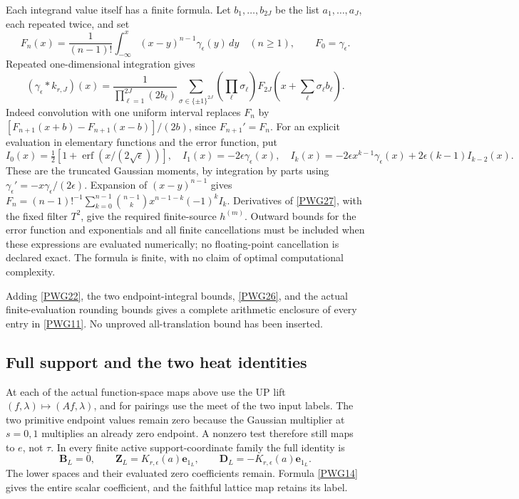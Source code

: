 Each integrand value itself has a finite formula. Let $b_1,\ldots,b_{2J}$ be the list $a_1,\ldots,a_J$, each repeated twice, and set
\[
 F_n(x)=\frac1{(n-1)!}\int_{-\infty}^x(x-y)^{n-1}\gamma_\epsilon(y)\,dy
 \quad(n\ge1),\qquad F_0=\gamma_\epsilon.
\]
Repeated one-dimensional integration gives
\begin{equation}
 (\gamma_\epsilon*k_{r,J})(x)=
 \frac1{\prod_{\ell=1}^{2J}(2b_\ell)}
 \sum_{\sigma\in\{\pm1\}^{2J}}\left(\prod_\ell\sigma_\ell\right)
 F_{2J}\left(x+\sum_\ell\sigma_\ell b_\ell\right).
                                                               \tag{PWG27}\label{PWG27}
\end{equation}
Indeed convolution with one uniform interval replaces $F_n$ by
$[F_{n+1}(x+b)-F_{n+1}(x-b)]/(2b)$, since $F_{n+1}'=F_n$.
For an explicit evaluation in elementary functions and the error function, put
\[
 I_0(x)=\tfrac12[1+\operatorname{erf}(x/(2\sqrt\epsilon))],\quad
 I_1(x)=-2\epsilon\gamma_\epsilon(x),\quad
 I_k(x)=-2\epsilon x^{k-1}\gamma_\epsilon(x)
                   +2\epsilon(k-1)I_{k-2}(x).
\]
These are the truncated Gaussian moments, by integration by parts using
$\gamma_\epsilon'=-x\gamma_\epsilon/(2\epsilon)$.
Expansion of $(x-y)^{n-1}$ gives
$F_n=(n-1)!^{-1}\sum_{k=0}^{n-1}\binom{n-1}{k}x^{n-1-k}(-1)^kI_k$.
Derivatives of \eqref{PWG27}, with the fixed filter $T^2$, give the required finite-source $h^{(m)}$. Outward bounds for the error function and exponentials and all finite cancellations must be included when these expressions are evaluated numerically; no floating-point cancellation is declared exact. The formula is finite, with no claim of optimal computational complexity.

Adding \eqref{PWG22}, the two endpoint-integral bounds, \eqref{PWG26}, and the actual finite-evaluation rounding bounds gives a complete arithmetic enclosure of every entry in \eqref{PWG11}. No unproved all-translation bound has been inserted.

\subsection{Full support and the two heat identities}
At each of the actual function-space maps above use the UP lift
$(f,\lambda)\mapsto(Af,\lambda)$, and for pairings use the meet of the two input labels. The two primitive endpoint values remain zero because the Gaussian multiplier at $s=0,1$ multiplies an already zero endpoint. A nonzero test therefore still maps to $e$, not $\tau$. In every finite active support-coordinate family the full identity is
\begin{equation}
 \boldsymbol B_L=0,\qquad
 \boldsymbol Z_L=K_{r,\epsilon}(a)\mathbf e_{1_L},\qquad
 \boldsymbol D_L=-K_{r,\epsilon}(a)\mathbf e_{1_L}.
                                                               \tag{PWG23}\label{PWG23}
\end{equation}
The lower spaces and their evaluated zero coefficients remain. Formula \eqref{PWG14} gives the entire scalar coefficient, and the faithful lattice map retains its label.


